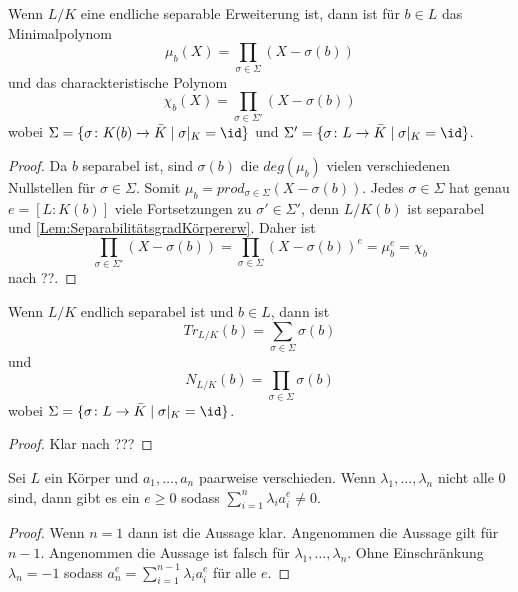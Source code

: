 \begin{Satz} Wenn \(L/K\) eine endliche separable Erweiterung ist, dann ist für \(b\in L\) das Minimalpolynom
	\[\mu_b(X)=\prod_{\sigma\in\Sigma}(X-\sigma(b))\] und das charackteristische Polynom
	\[\chi_b(X)=\prod_{\sigma\in\Sigma'}(X-\sigma(b))\]
	wobei \(\Sigma=\{\sigma\colon K(b)\to \bar K\mid \sigma|_K=\id\}\) und \(\Sigma'=\{\sigma\colon L\to \bar K\mid \sigma|_K=\id\}\).
\begin{proof}
	Da \(b\) separabel ist, sind \(\sigma(b)\) die \(deg(\mu_b)\) vielen verschiedenen Nullstellen für \(\sigma\in\Sigma\). Somit \(\mu_b=prod_{\sigma\in\Sigma}(X-\sigma(b))\).
	Jedes \(\sigma\in\Sigma\) hat genau \(e=[L:K(b)]\) viele
	Fortsetzungen zu \(\sigma'\in \Sigma'\), denn \(L/K(b)\) ist separabel und \ref{Lem:SeparabilitätsgradKörpererw}.
	Daher ist 
	\[\prod_{\sigma\in\Sigma'}(X-\sigma(b))=\prod_{\sigma\in\Sigma}(X-\sigma(b))^e=\mu_b^e=\chi_b\] nach ??.
\end{proof}
\begin{Kor}
	Wenn \(L/K\) endlich separabel ist und \(b\in L\), dann ist 
	\[Tr_{L/K}(b)=\sum_{\sigma\in\Sigma}\sigma(b)\] und
	\[N_{L/K}(b)=\prod_{\sigma\in\Sigma}\sigma(b)\] wobei
	\(\Sigma=\{\sigma\colon L\to\bar K\mid \sigma|_K=\id\}\).
\end{Kor}
\begin{proof}
	Klar nach ???
\end{proof}
\begin{Lemma} Sei \(L\) ein Körper und \(a_1,\dots,a_n\) paarweise verschieden. Wenn \(\lambda_1,\dots,\lambda_n\) nicht alle \(0\) sind, dann gibt es ein \(e\geq 0\) sodass \(\sum_{i=1}^n\lambda_i a_i^e\neq 0\).
\end{Lemma}
\begin{proof}
	Wenn \(n=1\) dann ist die Aussage klar.
	Angenommen die Aussage gilt für \(n-1\). Angenommen die Aussage ist falsch für \(\lambda_1,\dots,\lambda_n\). Ohne Einschränkung \(\lambda_n=-1\) sodass \(a_n^e=\sum_{i=1}^{n-1}\lambda_i a_i ^e\) für alle \(e\).
	

\end{proof}
\end{Satz}
